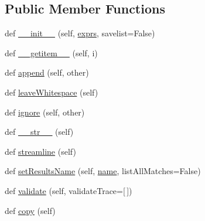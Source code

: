 \subsection*{Public Member Functions}
\begin{DoxyCompactItemize}
\item 
def \hyperlink{classpkg__resources_1_1__vendor_1_1pyparsing_1_1ParseExpression_a5043898cb91712fba96512b0cf7e451c}{\+\_\+\+\_\+init\+\_\+\+\_\+} (self, \hyperlink{classpkg__resources_1_1__vendor_1_1pyparsing_1_1ParseExpression_ae9e07a06d183190717e964e7ff907363}{exprs}, savelist=False)
\item 
def \hyperlink{classpkg__resources_1_1__vendor_1_1pyparsing_1_1ParseExpression_a160e10c289762dbfa849d7e42eace8fc}{\+\_\+\+\_\+getitem\+\_\+\+\_\+} (self, i)
\item 
def \hyperlink{classpkg__resources_1_1__vendor_1_1pyparsing_1_1ParseExpression_a09836179cd57eede9e0f7a9e504bbf6e}{append} (self, other)
\item 
def \hyperlink{classpkg__resources_1_1__vendor_1_1pyparsing_1_1ParseExpression_a92305dfced0c62b9242cd2546c745ef5}{leave\+Whitespace} (self)
\item 
def \hyperlink{classpkg__resources_1_1__vendor_1_1pyparsing_1_1ParseExpression_a6d254b91e3a765657c4714b48a2246c0}{ignore} (self, other)
\item 
def \hyperlink{classpkg__resources_1_1__vendor_1_1pyparsing_1_1ParseExpression_a3b27eab2bd9bb784c6909be2f53d019d}{\+\_\+\+\_\+str\+\_\+\+\_\+} (self)
\item 
def \hyperlink{classpkg__resources_1_1__vendor_1_1pyparsing_1_1ParseExpression_aa064e6efeb35ac7a1d386a9ac23a6f17}{streamline} (self)
\item 
def \hyperlink{classpkg__resources_1_1__vendor_1_1pyparsing_1_1ParseExpression_a595f7c1d8843641bb5ea70b5f27af5f5}{set\+Results\+Name} (self, \hyperlink{classpkg__resources_1_1__vendor_1_1pyparsing_1_1ParserElement_a5c6a6316d9f079f59fd7e589559de911}{name}, list\+All\+Matches=False)
\item 
def \hyperlink{classpkg__resources_1_1__vendor_1_1pyparsing_1_1ParseExpression_a1b1f5c9a08dd00461b991465cc5e2fd6}{validate} (self, validate\+Trace=\mbox{[}$\,$\mbox{]})
\item 
def \hyperlink{classpkg__resources_1_1__vendor_1_1pyparsing_1_1ParseExpression_a933c4e7e560659c0b4db924fc3ee65bf}{copy} (self)
\end{DoxyCompactItemize}
